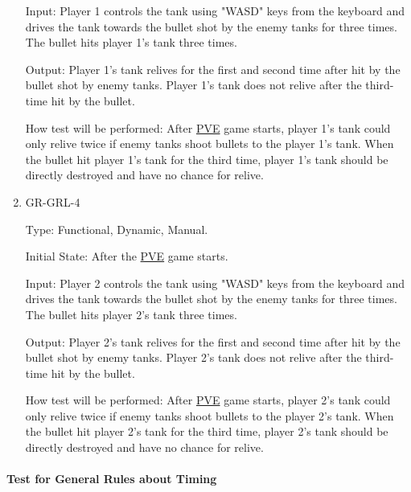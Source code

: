 \documentclass[12pt, titlepage]{article}
\begin{document}
\begin{enumerate}
Input: Player 1 controls the tank using "WASD" keys from the keyboard and drives the tank towards the bullet shot by the enemy tanks for three times. The bullet hits player 1's tank three times.
					
Output: Player 1's tank relives for the first and second time after hit by the bullet shot by enemy tanks. Player 1's tank does not relive after the third-time hit by the bullet.
					
How test will be performed: After \underline{PVE} game starts, player 1's tank could only relive twice if enemy tanks shoot bullets to the player 1's tank. When the bullet hit player 1's tank for the third time, player 1's tank should be directly destroyed and have no chance for relive.

\item{GR-GRL-4\\}

Type: Functional, Dynamic, Manual.
					
Initial State: After the \underline{PVE} game starts.
					
Input: Player 2 controls the tank using "WASD" keys from the keyboard and drives the tank towards the bullet shot by the enemy tanks for three times. The bullet hits player 2's tank three times.
					
Output: Player 2's tank relives for the first and second time after hit by the bullet shot by enemy tanks. Player 2's tank does not relive after the third-time hit by the bullet.
					
How test will be performed: After \underline{PVE} game starts, player 2's tank could only relive twice if enemy tanks shoot bullets to the player 2's tank. When the bullet hit player 2's tank for the third time, player 2's tank should be directly destroyed and have no chance for relive.

\end{enumerate}

\paragraph{Test for General Rules about Timing}
\end{document}
